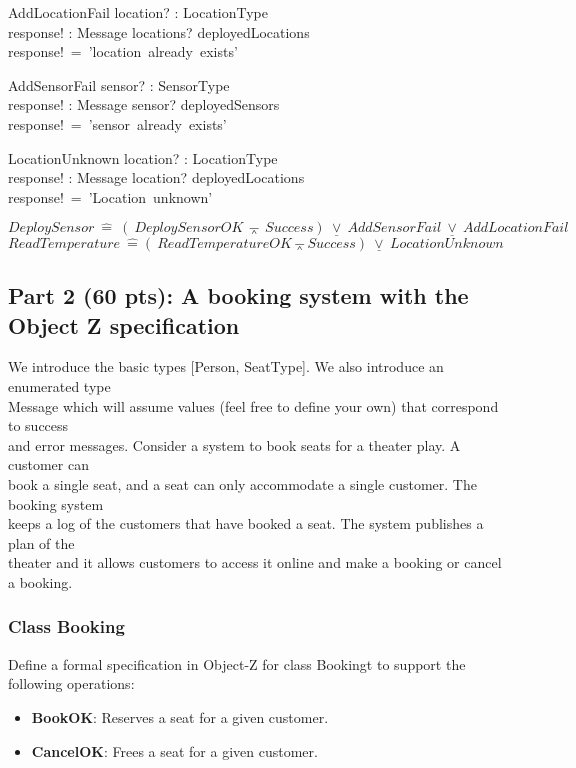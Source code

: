 \documentclass[12pt]{article}
\begin{document}
\begin{class}{AddLocationFail}
location? : LocationType\\
response! : Message
\ST
locations? \in deployedLocations\\
response!~=~'location~already~exists'\\
\end{class}
\begin{class}{AddSensorFail}
sensor? : SensorType\\
response! : Message
\ST
sensor? \in deployedSensors\\
response!~=~'sensor~already~exists'
\end{class}
\begin{class}{LocationUnknown}
location? : LocationType\\
response! : Message
\ST
location? \notin deployedLocations\\
response!~=~'Location~unknown'
\end{class}
$DeploySensor~\hat{=}~(~DeploySensorOK~\barwedge~Success)~\underline{\vee}~AddSensorFail~\underline{\vee}~AddLocationFail$\\
$ReadTemperature~\hat{=} (~ReadTemperatureOK \barwedge Success)~\underline{\vee}~ LocationUnknown$
\newpage
\subsection{Part 2 (60 pts): A booking system with the Object Z specification}

\noindent We introduce the basic types [Person, SeatType]. We also introduce an enumerated type\\
Message which will assume values (feel free to define your own) that correspond to success\\
and error messages. Consider a system to book seats for a theater play. A customer can\\
book a single seat, and a seat can only accommodate a single customer. The booking system\\
keeps a log of the customers that have booked a seat. The system publishes a plan of the\\
theater and it allows customers to access it online and make a booking or cancel a booking.\\
\subsubsection{Class Booking}
\noindent Define a formal specification in Object-Z for class Bookingt to support the following operations:
\begin{itemize}
	\item \textbf{BookOK}: Reserves a seat for a given customer.
	\item \textbf{CancelOK}: Frees a seat for a given customer.
\end{itemize}
\end{document}
